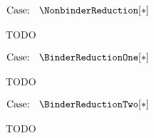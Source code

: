 $\text{Case: }\begin{array}{c} \NonbinderReduction[*] \end{array}$
\begin{proofcase}
    TODO
\end{proofcase}

$\text{Case: }\begin{array}{c} \BinderReductionOne[*] \end{array}$
\begin{proofcase}
    TODO
\end{proofcase}

$\text{Case: }\begin{array}{c} \BinderReductionTwo[*] \end{array}$
\begin{proofcase}
    TODO
\end{proofcase}
